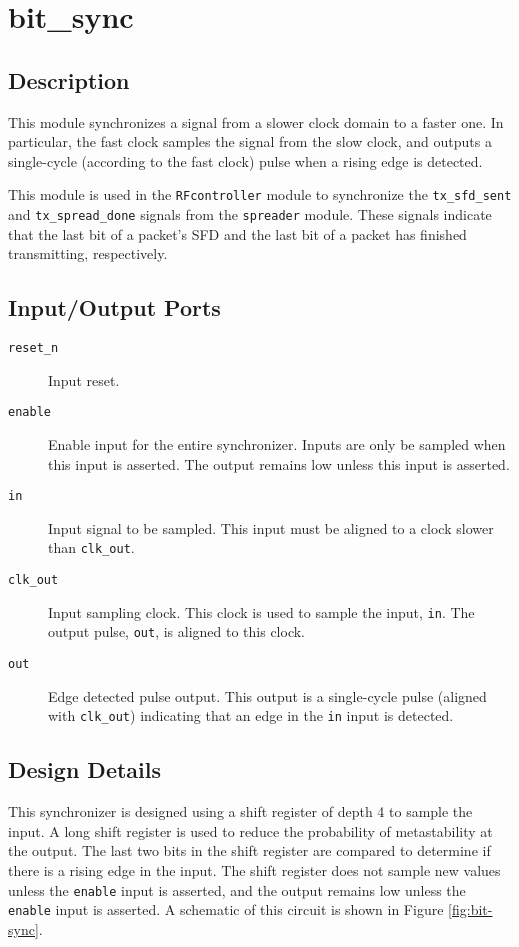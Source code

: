 \section{bit\_sync}
\subsection{Description}
This module synchronizes a signal from a slower clock domain to a faster one. In particular, the fast clock samples the signal from the slow clock, and outputs a single-cycle (according to the fast clock) pulse when a rising edge is detected.

This module is used in the \texttt{RFcontroller} module to synchronize the \texttt{tx\_sfd\-\_sent} and \texttt{tx\_spread\-\_done} signals from the \texttt{spreader} module. These signals indicate that the last bit of a packet's SFD and the last bit of a packet has finished transmitting, respectively.

\subsection{Input/Output Ports}
\begin{description}
	\item[\texttt{reset\_n}] Input reset.
	\item[\texttt{enable}] Enable input for the entire synchronizer. Inputs are only be sampled when this input is asserted. The output remains low unless this input is asserted.
	\item[\texttt{in}] Input signal to be sampled. This input must be aligned to a clock slower than \texttt{clk\_out}.
	\item[\texttt{clk\_out}] Input sampling clock. This clock is used to sample the input, \texttt{in}. The output pulse, \texttt{out}, is aligned to this clock.
	\item[\texttt{out}] Edge detected pulse output. This output is a single-cycle pulse (aligned with \texttt{clk\_out}) indicating that an edge in the \texttt{in} input is detected.
\end{description}

\subsection{Design Details}
This synchronizer is designed using a shift register of depth 4 to sample the input. A long shift register is used to reduce the probability of metastability at the output. The last two bits in the shift register are compared to determine if there is a rising edge in the input. The shift register does not sample new values unless the \texttt{enable} input is asserted, and the output remains low unless the \texttt{enable} input is asserted. A schematic of this circuit is shown in Figure \ref{fig:bit-sync}.

